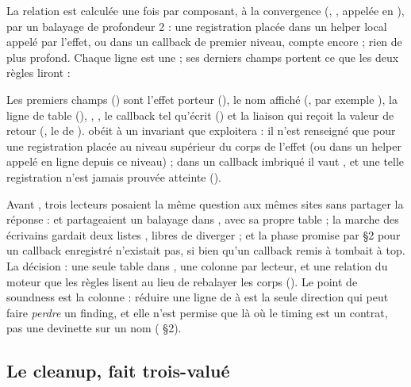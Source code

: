 La relation est calculée une fois par composant, à la convergence (, , appelée en ), par un balayage de profondeur 2 : une registration placée dans un helper local appelé par l'effet, ou dans un callback de premier niveau, compte encore ; rien de plus profond. Chaque ligne est une  ; ses derniers champs portent ce que les deux règles liront :


Les premiers champs () sont l'effet porteur (), le nom affiché (, par exemple ), la ligne de table (), , , le callback tel qu'écrit () et la liaison qui reçoit la valeur de retour (, le  de ).  obéit à un invariant que  exploitera : il n'est renseigné que pour une registration placée au niveau supérieur du corps de l'effet (ou dans un helper appelé en ligne depuis ce niveau) ; dans un callback imbriqué il vaut , et une telle registration n'est jamais prouvée atteinte ().

\begin{decision}
Avant , trois lecteurs posaient la même question aux mêmes sites sans partager la réponse :  et  partageaient un balayage dans , avec sa propre table ; la marche des écrivains gardait deux listes , libres de diverger ; et la \og phase\fg{} promise par  §2 pour un callback enregistré n'existait pas, si bien qu'un callback remis à  tombait à top. La décision : une seule table dans , une colonne par lecteur, et une relation du moteur que les règles lisent au lieu de rebalayer les corps (). Le point de soundness est la colonne  : réduire une ligne de  à  est la seule direction qui peut faire \emph{perdre} un finding, et elle n'est permise que là où le timing est un contrat, pas une devinette sur un nom ( §2).
\end{decision}

\subsection{Le cleanup, fait trois-valué}

